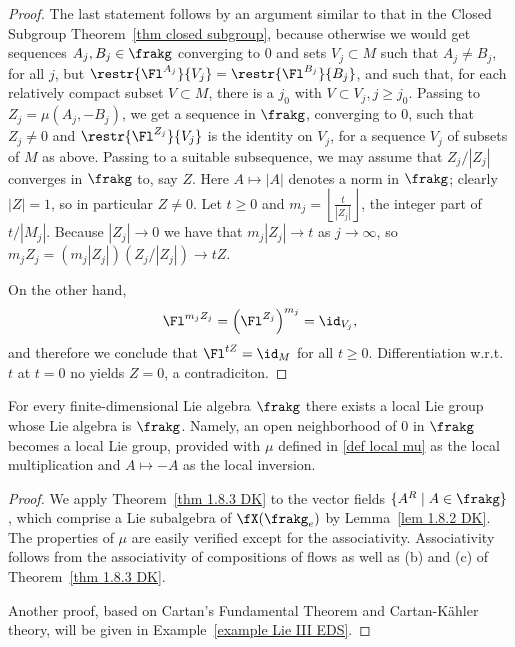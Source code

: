 \begin{proof}
    The last statement follows by an argument similar to that in the Closed Subgroup Theorem~\ref{thm closed subgroup}, because otherwise we would get sequences $A_j,B_j\in\frakg$ converging to $0$ and sets $V_j\subset M$ such that $A_j\neq B_j$, for all $j$, but $\restr{\Fl^{A_j}}{V_j}=\restr{\Fl^{B_j}}{B_j}$, and such that, for each relatively compact subset $V\subset M$, there is a $j_0$ with $V\subset V_j,j\geq j_0$. Passing to $Z_j=\mu(A_j,-B_j)$, we get a sequence in $\frakg$, converging to $0$, such that $Z_j\neq 0$ and $\restr{\Fl^{Z_j}}{V_j}$ is the identity on $V_j$, for a sequence $V_j$ of subsets of $M$ as above. Passing to a suitable subsequence, we may assume that $Z_j/|Z_j|$ converges in $\frakg$ to, say $Z$. Here $A\mapsto |A|$ denotes a norm in $\frakg$; clearly $|Z|=1$, so in particular $Z\neq 0$. Let $t\geq 0$ and $m_j=\left\lfloor\frac{t}{|Z_j|}\right\rfloor$, the integer part of $t/|M_j|$. Because $|Z_j|\to 0$ we have that $m_j|Z_j|\to t$ as $j\to \infty$, so $m_j Z_j=(m_j|Z_j|)(Z_j/|Z_j|)\to tZ$.

    On the other hand,
    \[\Fl^{m_jZ_j}=\left(\Fl^{Z_j}\right)^{m_j}=\id_{V_j},\]
    and therefore we conclude that $\Fl^{tZ}=\id_{M}$ for all $t\geq 0$. Differentiation w.r.t.\ $t$ at $t=0$ no yields $Z=0$, a contradiciton.
\end{proof}


\begin{thm}\label{thm local Lie's third}
    For every finite-dimensional Lie algebra $\frakg$ there exists a local Lie group whose Lie algebra is $\frakg$. Namely, an open neighborhood of $0$ in $\frakg$ becomes a local Lie group, provided with $\mu$ defined in \eqref{def local mu} as the local multiplication and $A\mapsto -A$ as the local inversion.
\end{thm}
\begin{proof}
    We apply Theorem~\ref{thm 1.8.3 DK} to the vector fields $\{A^R\mid A\in\frakg\}$, which comprise a Lie subalgebra of $\fX(\frakg_e)$ by Lemma~\ref{lem 1.8.2 DK}. The properties of $\mu$ are easily verified except for the associativity. Associativity follows from the associativity of compositions of flows as well as (b) and (c) of Theorem~\ref{thm 1.8.3 DK}.

    Another proof, based on Cartan's Fundamental Theorem and Cartan-K\"ahler theory, will be given in Example~\ref{example Lie III EDS}. 
\end{proof}

